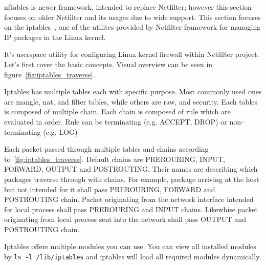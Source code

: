 \documentclass[times, utf8, seminar, english]{fer}
\begin{document}
nftables is newer framework, intended to replace Netfilter; however this section focuses on older Netfilter and its usages due to wide support.
This section focuses on the iptables~\cite{iptables77:online}, one of the utilites provided by Netfilter framework for managing IP packages in the Linux kernel.

It's userspace utility for configuring Linux kernel firewall within Netfilter project.
Let's first cover the basic concepts.
Visual overview can be seen in figure~\ref{fig:iptables_traverse}.

Iptables has multiple tables each with specific purpose.
Most commonly used ones are mangle, nat, and filter tables, while others are raw, and security. 
Each tables is composed of multiple chain. 
Each chain is composed of rule which are evaluated in order. 
Rule can be terminating (e.g. ACCEPT, DROP) or non-terminating (e.g. LOG)

Each packet passed through multiple tables and chains according to~\ref{fig:iptables_traverse}.
Default chains are PREROURING, INPUT, FORWARD, OUTPUT and POSTROUTING.
Their names are describing which packages traverse through with chains. 
For example, package arriving at the host but not intended for it shall pass PREROURING, FORWARD and POSTROUTING chain.
Packet originating from the network interface intended for local process shall pass PREROURING and INPUT chains.
Likewhise packet originating from local process sent into the network shall pass OUTPUT and POSTROUTING chain. 

Iptables offers multiple modules you can use. 
You can view all installed modules by \texttt{ls -l /lib/iptables} and iptables will load all required modules dynamically.
\end{document}
